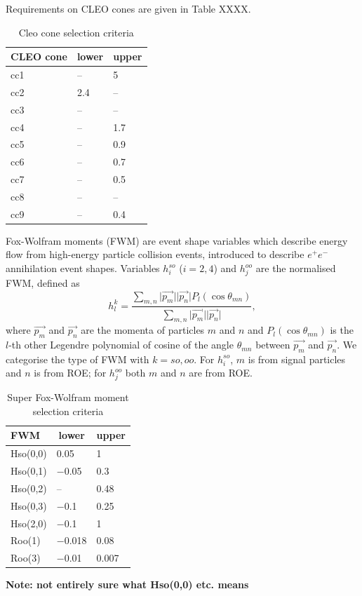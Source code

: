 \documentclass[12pt]{thesis}  %
\begin{document}
Requirements on CLEO cones are given in Table XXXX.

\begin{table}[h]
\centering
\begin{tabular}{lll}
\textbf{CLEO cone} & \multicolumn{1}{c}{\textbf{lower}} & \multicolumn{1}{c}{\textbf{upper}} \\ \hline
cc1 & -- & \num{5} \\
cc2 & \num{2.4} & -- \\
cc3 & -- & -- \\
cc4 & -- & \num{1.7} \\
cc5 & -- & \num{0.9} \\
cc6 & -- & \num{0.7} \\
cc7 & -- & \num{0.5} \\
cc8 & -- & -- \\
cc9 & -- & \num{0.4}
\end{tabular}
\caption{Cleo cone selection criteria}
\label{my-label}
\end{table}

Fox-Wolfram moments (FWM) are event shape variables which describe energy flow from high-energy particle collision events, introduced to describe $e^+ e^-$ annihilation event shapes. Variables $h^{so}_i$ ($i=2,4$) and $h^{oo}_j$ are the normalised FWM, defined as
\begin{equation}
h_l^k = \frac{\sum_{m,n}\lvert\vec{p_m}\rvert\lvert\vec{p_n}\rvert P_l(\cos\theta_{mn})}
{\sum_{m,n}\lvert\vec{p_m}\rvert\lvert\vec{p_n}\rvert},
\end{equation}
where $\vec{p_m}$ and $\vec{p_n}$ are the momenta of particles $m$ and $n$ and $P_l(\cos\theta_{mn})$ is the $l$-th other Legendre polynomial of cosine of the angle $\theta_{mn}$ between $\vec{p_m}$ and $\vec{p_n}$. We categorise the type of FWM with $k=so,oo$. For $h^{so}_i$, $m$ is from signal particles and $n$ is from ROE; for $h^{oo}_{j}$ both $m$ and $n$ are from ROE.

\begin{table}[h]
\centering
\begin{tabular}{lll}
\textbf{FWM} & \multicolumn{1}{c}{\textbf{lower}} & \multicolumn{1}{c}{\textbf{upper}} \\ \hline
Hso(0,0) & \num{0.05} & \num{1} \\
Hso(0,1) & \num{-0.05} & \num{0.3} \\
Hso(0,2) & -- & \num{0.48} \\
Hso(0,3) & \num{-0.1} & \num{0.25} \\
Hso(2,0) & \num{-0.1} & \num{1} \\
Roo(1) & \num{-0.018} & \num{0.08} \\
Roo(3) & \num{-0.01} & \num{0.007}
\end{tabular}
\caption{Super Fox-Wolfram moment selection criteria}
\label{my-label}
\end{table}
\textbf{Note: not entirely sure what Hso(0,0) etc. means}
\end{document}
